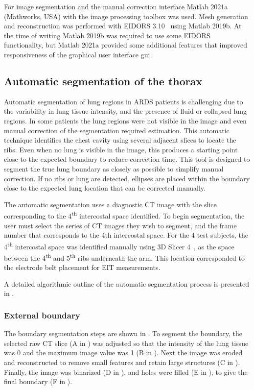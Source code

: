 For image segmentation and the manual correction interface
Matlab 2021a (Mathworks, USA) with the image 
processing toolbox was used.
Mesh generation and reconstruction was performed with 
EIDORS 3.10~\parencite{adler_eidors_2017} using Matlab 2019b.
At the time of writing Matlab 2019b was required to 
use some EIDORS functionality, but Matlab 2021a provided some additional 
features that improved responsiveness of the 
graphical user interface \acrshort{gui}.

\subsection{Automatic segmentation of the thorax} \label{sec:auto-segment}
Automatic segmentation of lung regions in ARDS patients is challenging due to the variability
in lung tissue intensity, and the presence of fluid or collapsed lung regions. 
In some patients the lung regions were not visible in the image and even manual
correction of the segmentation required estimation. 
This automatic technique identifies the chest cavity using several adjacent slices to
locate the ribs.
Even when no lung is visible in the image, this produces a starting point
close to the expected boundary to reduce correction time. 
This tool is designed to segment the true lung boundary as closely as possible to 
simplify manual correction.
If no ribs or lung are detected, ellipses are placed within the boundary 
close to the expected lung location that 
can be corrected manually.

The automatic segmentation uses a diagnostic CT image 
with the slice corresponding to the 4\textsuperscript{th} intercostal space 
identified. 
To begin segmentation, the user must select the series of CT images they 
wish to segment, and the frame number that corresponds to the 4th intercostal 
space. For the 4 test subjects, the 4\textsuperscript{th} 
intercostal space was identified manually using
3D Slicer 4~\parencite{fedorov_3d_2012}, as the space between the
4\textsuperscript{th} and 5\textsuperscript{th} ribs underneath the arm.
This location corresponded to the electrode belt placement for EIT measurements.

A detailed algorithmic outline of the automatic segmentation process is 
presented in .

\subsubsection{External boundary} \label{sec:ext_seg}
The boundary segmentation steps are shown in .
To segment the boundary, the selected raw CT slice 
(A in ) 
was adjusted so that the
intensity of the lung tissue was 0 and the maximum image value was 1 
(B in ). 
Next the image was eroded and reconstructed 
to remove small features and retain large structures 
(C in ).
Finally, the image was binarized (D in ),
and holes were filled (E in ), 
to give the final boundary (F in ).

